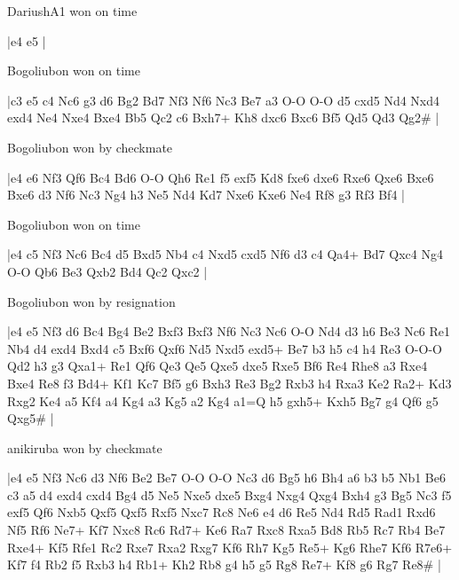 \showboard

DariushA1 won on time

\makegametitle
|e4 e5  |

\showboard

Bogoliubon won on time

\makegametitle
|c3 e5 c4 Nc6 g3 d6 Bg2 Bd7 Nf3 Nf6 Nc3 Be7 a3 O-O O-O d5 cxd5 Nd4 Nxd4 exd4 Ne4 Nxe4 Bxe4 Bb5 Qc2 c6 Bxh7+ Kh8 dxc6 Bxc6 Bf5 Qd5 Qd3 Qg2\#  |

\showboard

Bogoliubon won by checkmate

\makegametitle
|e4 e6 Nf3 Qf6 Bc4 Bd6 O-O Qh6 Re1 f5 exf5 Kd8 fxe6 dxe6 Rxe6 Qxe6 Bxe6 Bxe6 d3 Nf6 Nc3 Ng4 h3 Ne5 Nd4 Kd7 Nxe6 Kxe6 Ne4 Rf8 g3 Rf3 Bf4  |

\showboard

Bogoliubon won on time

\makegametitle
|e4 c5 Nf3 Nc6 Bc4 d5 Bxd5 Nb4 c4 Nxd5 cxd5 Nf6 d3 c4 Qa4+ Bd7 Qxc4 Ng4 O-O Qb6 Be3 Qxb2 Bd4 Qc2 Qxc2  |

\showboard

Bogoliubon won by resignation

\makegametitle
|e4 e5 Nf3 d6 Bc4 Bg4 Be2 Bxf3 Bxf3 Nf6 Nc3 Nc6 O-O Nd4 d3 h6 Be3 Nc6 Re1 Nb4 d4 exd4 Bxd4 c5 Bxf6 Qxf6 Nd5 Nxd5 exd5+ Be7 b3 h5 c4 h4 Re3 O-O-O Qd2 h3 g3 Qxa1+ Re1 Qf6 Qe3 Qe5 Qxe5 dxe5 Rxe5 Bf6 Re4 Rhe8 a3 Rxe4 Bxe4 Re8 f3 Bd4+ Kf1 Kc7 Bf5 g6 Bxh3 Re3 Bg2 Rxb3 h4 Rxa3 Ke2 Ra2+ Kd3 Rxg2 Ke4 a5 Kf4 a4 Kg4 a3 Kg5 a2 Kg4 a1=Q h5 gxh5+ Kxh5 Bg7 g4 Qf6 g5 Qxg5\#  |

\showboard

anikiruba won by checkmate

\makegametitle
|e4 e5 Nf3 Nc6 d3 Nf6 Be2 Be7 O-O O-O Nc3 d6 Bg5 h6 Bh4 a6 b3 b5 Nb1 Be6 c3 a5 d4 exd4 cxd4 Bg4 d5 Ne5 Nxe5 dxe5 Bxg4 Nxg4 Qxg4 Bxh4 g3 Bg5 Nc3 f5 exf5 Qf6 Nxb5 Qxf5 Qxf5 Rxf5 Nxc7 Rc8 Ne6 e4 d6 Re5 Nd4 Rd5 Rad1 Rxd6 Nf5 Rf6 Ne7+ Kf7 Nxc8 Rc6 Rd7+ Ke6 Ra7 Rxc8 Rxa5 Bd8 Rb5 Rc7 Rb4 Be7 Rxe4+ Kf5 Rfe1 Rc2 Rxe7 Rxa2 Rxg7 Kf6 Rh7 Kg5 Re5+ Kg6 Rhe7 Kf6 R7e6+ Kf7 f4 Rb2 f5 Rxb3 h4 Rb1+ Kh2 Rb8 g4 h5 g5 Rg8 Re7+ Kf8 g6 Rg7 Re8\#  |

